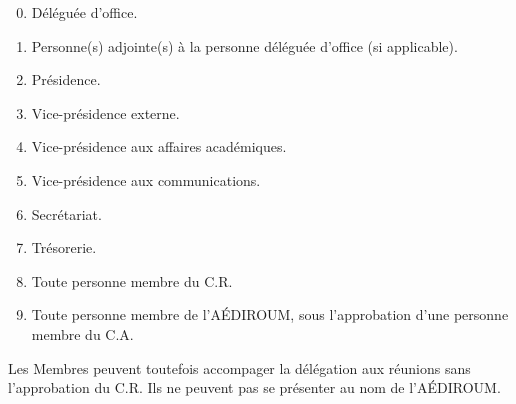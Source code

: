 \documentclass{aediroum}
\begin{document}
\begin{enumerate}\setcounter{enumi}{-1}
    \item Déléguée d'office.
    \item Personne(s) adjointe(s) à la personne déléguée d’office (si applicable).
    \item Présidence.
    \item Vice-présidence externe.
    \item Vice-présidence aux affaires académiques.
    \item Vice-présidence aux communications.
    \item Secrétariat.
    \item Trésorerie.
    \item Toute personne membre du C.R.
    \item Toute personne membre de l'AÉDIROUM, sous l'approbation d'une personne membre du C.A.
\end{enumerate}

Les Membres peuvent toutefois accompager la délégation aux réunions sans l'approbation du C.R. Ils ne peuvent pas se présenter au nom de l'AÉDIROUM.
\end{document}

